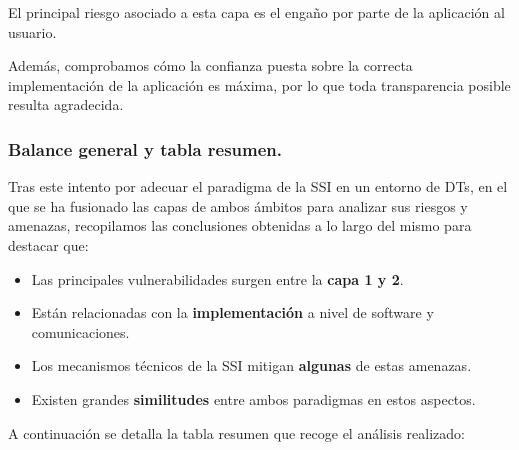 \documentclass[../main.tex]{subfiles}
\begin{document}
\begin{tcolorbox}[colback=gray!10!white, colframe=gray!50!black, title=Análisis de la Capa \theanalisis]\label{analisis-C4}
El principal riesgo asociado a esta capa es el engaño por parte de la aplicación al usuario. 

Además, comprobamos cómo la confianza puesta sobre la correcta implementación de la aplicación es máxima, por lo que toda transparencia posible resulta agradecida.  
\end{tcolorbox}


\newpage
\subsubsection{Balance general y tabla resumen.}\label{Balance general y tabla resumen}
Tras este intento por adecuar el paradigma de la \acrshort{SSI} en un entorno de \acrshort{DT}s, en el que se ha fusionado las capas de ambos ámbitos para analizar sus riesgos y amenazas, recopilamos las conclusiones obtenidas a lo largo del mismo para destacar que: 

\begin{itemize}
    \item Las principales vulnerabilidades surgen entre la \textbf{capa 1 y 2}. 
    \item Están relacionadas con la \textbf{implementación} a nivel de software y comunicaciones. 
    \item Los mecanismos técnicos de la \acrshort{SSI} mitigan \textbf{algunas} de estas amenazas.
    \item Existen grandes \textbf{similitudes} entre ambos paradigmas en estos aspectos.
\end{itemize}
A continuación se detalla la tabla resumen que recoge el análisis realizado: 
\\
\end{document}
